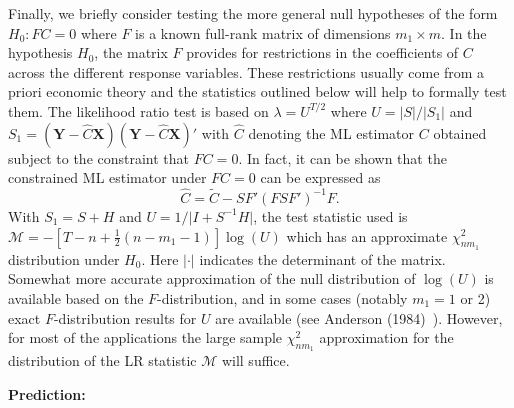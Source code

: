 Finally, we briefly consider testing the more general null hypotheses of the form $H_0: FC=0$ where $F$ is a known full-rank matrix of dimensions $m_1 \times m$. In the hypothesis $H_0$, the matrix $F$ provides for restrictions in the coefficients of $C$ across the different response variables. These restrictions usually come from a priori economic theory and the statistics outlined below will help to formally test them. The likelihood ratio test is based on $\lambda= U^{T/2}$ where $U= |S|/|S_1|$ and $S_1= (\mathbf{Y} - \hat{C}\mathbf{X})(\mathbf{Y}  - \hat{C}\mathbf{X})'$ with $\hat{C}$ denoting the ML estimator $C$ obtained subject to the constraint that $FC=0$. In fact, it can be shown that the constrained ML estimator under $FC= 0$ can be expressed as
	\begin{equation} \label{eqn:lagconstr}
	\hat{C}= \tilde{C} - SF'(FSF')^{-1} F.
	\end{equation}
With $S_1= S + H$ and $U= 1/\lvert I + S^{-1}H \rvert$, the test statistic used is $\mathcal{M}= -[T - n + \frac{1}{2}(n - m_1 - 1)]\log(U)$ which has an approximate $\chi_{nm_1}^2$ distribution under $H_0$. Here $|\cdot|$ indicates the determinant of the matrix. Somewhat more accurate approximation of the null distribution of $\log(U)$ is available based on the $F$-distribution, and in some cases (notably $m_1= 1$ or 2) exact $F$-distribution results for $U$ are available (see Anderson (1984)~\cite[Chap. 8]{andersontw2}). However, for most of the applications the large sample $\chi_{nm_1}^2$ approximation for the distribution of the LR statistic $\mathcal{M}$ will suffice. \twomedskip


\noindent \textbf{Prediction:} \twomedskip


